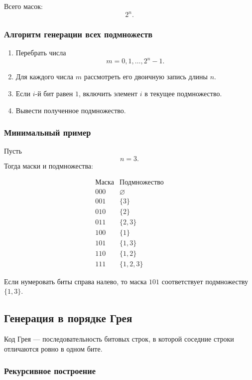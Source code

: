 \documentclass[12pt,a4paper]{article}
\begin{document}
Всего масок:
\[
2^n.
\]

\subsubsection*{Алгоритм генерации всех подмножеств}

\begin{enumerate}
    \item Перебрать числа
    \[
    m=0,1,\dots,2^n-1.
    \]
    \item Для каждого числа $m$ рассмотреть его двоичную запись длины $n$.
    \item Если $i$-й бит равен $1$, включить элемент $i$ в текущее подмножество.
    \item Вывести полученное подмножество.
\end{enumerate}

\subsubsection*{Минимальный пример}

Пусть
\[
n=3.
\]
Тогда маски и подмножества:

\[
\begin{array}{c|c}
\text{Маска} & \text{Подмножество}\\
\hline
000 & \varnothing\\
001 & \{3\}\\
010 & \{2\}\\
011 & \{2,3\}\\
100 & \{1\}\\
101 & \{1,3\}\\
110 & \{1,2\}\\
111 & \{1,2,3\}
\end{array}
\]

Если нумеровать биты справа налево, то маска $101$ соответствует подмножеству $\{1,3\}$.

\subsection{Генерация в порядке Грея}

Код Грея --- последовательность битовых строк, в которой соседние строки отличаются ровно в одном бите.

\subsubsection*{Рекурсивное построение}
\end{document}
